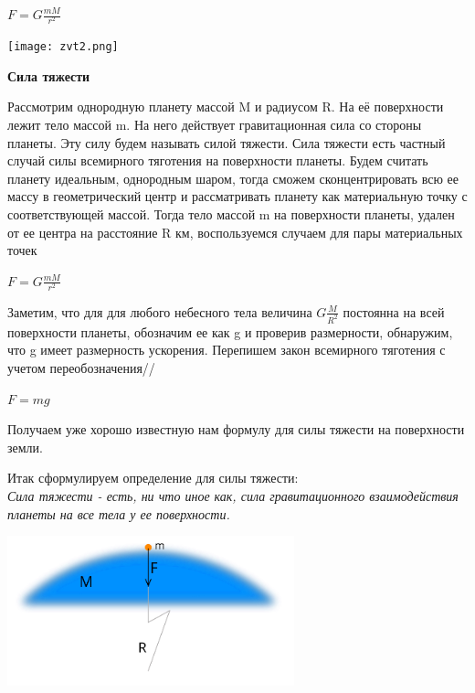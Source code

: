 \documentclass[12pt, letterpaper, twoside]{article}
\begin{document}
\begin{center}
$F=G\frac{mM}{r^2}$\\
\end{center}


\begin{center}
\texttt{[image: zvt2.png]} \\

\end{center}



\begin{center}
    \textbf{Сила тяжести} \\
\end{center}

Рассмотрим однородную планету массой M и радиусом R. На её поверхности лежит тело массой m. На него действует гравитационная сила со стороны планеты. Эту силу будем называть силой тяжести. Сила тяжести есть частный случай силы всемирного тяготения на поверхности планеты.
Будем считать планету идеальным, однородным шаром, тогда сможем сконцентрировать всю ее массу в геометрический центр и рассматривать планету как материальную точку с соответствующей массой. Тогда тело массой m на поверхности планеты, удален от ее центра на расстояние R км, воспользуемся случаем для пары материальных точек 
\begin{center}
   $F=G\frac{mM}{r^2}$\\
\end{center}

	Заметим, что для для любого небесного тела величина
$G\frac{M}{R^2}$ постоянна на всей поверхности планеты, обозначим ее как g и проверив размерности, обнаружим, что g имеет размерность ускорения. Перепишем закон всемирного тяготения с учетом переобозначения//
\begin{center}
   $F=mg$\\

\end{center}

Получаем уже хорошо известную нам формулу для силы тяжести на поверхности земли.

Итак сформулируем определение для силы тяжести:\\
\textit{Сила тяжести - есть, ни что иное как, сила гравитационного взаимодействия планеты на все тела у ее поверхности.}
\begin{center}
   \includegraphics{zvt3.png} \\

\end{center}
\end{document}
